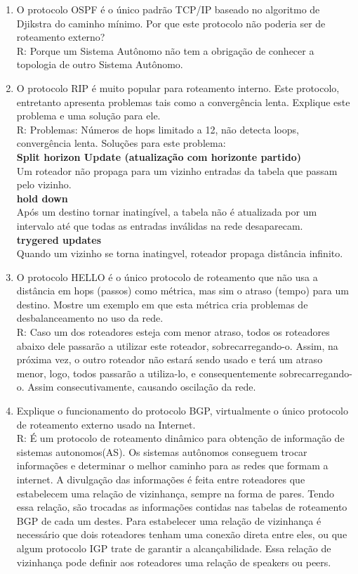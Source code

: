 \documentclass{article}
\begin{document}
\begin{enumerate}
	\item O protocolo OSPF é o único padrão TCP/IP baseado no algoritmo de Djikstra do caminho mínimo. Por que este protocolo não poderia ser de roteamento externo?
	\\R: Porque um Sistema Autônomo não tem a obrigação de conhecer a topologia de outro Sistema Autônomo.

	
	\item O protocolo RIP é muito popular para roteamento interno. Este protocolo, entretanto apresenta problemas tais como a convergência lenta. Explique este problema e uma solução para ele.
	\\R: Problemas: Números de hops limitado a 12, não detecta loops, convergência lenta. Soluções para este problema:
	\\\textbf{Split horizon Update (atualização com horizonte partido)}
	\\Um roteador não propaga para um vizinho entradas da tabela que passam pelo vizinho.
	\\\textbf{hold down}
	\\Após um destino tornar inatingível, a tabela não é atualizada por um intervalo até que todas as entradas inválidas na rede desaparecam.
	\\\textbf{trygered updates}
	\\Quando um vizinho se torna inatingvel, roteador propaga distância infinito.

	\item O protocolo HELLO é o único protocolo de roteamento que não usa a distância em hops (passos) como métrica, mas sim o atraso (tempo) para um destino. Mostre um exemplo em que esta métrica cria problemas de desbalanceamento no uso da rede.
	\\R: Caso um dos roteadores esteja com menor atraso, todos os roteadores abaixo dele passarão a utilizar este roteador, sobrecarregando-o. Assim, na próxima vez, o outro roteador não estará sendo usado e terá um atraso menor, logo, todos passarão a utiliza-lo, e consequentemente sobrecarregando-o. Assim consecutivamente, causando oscilação da rede.

	\item Explique o funcionamento do protocolo BGP, virtualmente o único protocolo de roteamento externo usado na Internet.
	\\R: É um protocolo de roteamento dinâmico para obtenção de informação de sistemas autonomos(AS). Os sistemas autônomos conseguem trocar informações e determinar o melhor caminho para as redes que formam a internet. A divulgação das informações é feita entre roteadores que estabelecem uma relação de vizinhança, sempre na forma de pares. Tendo essa relação, são trocadas as informações contidas nas tabelas de roteamento BGP de cada um destes. Para estabelecer uma relação de vizinhança é necessário que dois roteadores tenham uma conexão direta entre eles, ou que algum protocolo IGP trate de garantir a alcançabilidade. Essa relação de vizinhança pode definir aos roteadores uma relação de speakers ou peers.
\end{enumerate}
\end{document}
